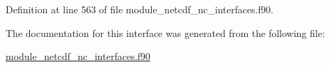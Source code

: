 Definition at line 563 of file module\+\_\+netcdf\+\_\+nc\+\_\+interfaces.\+f90.



The documentation for this interface was generated from the following file\+:\begin{DoxyCompactItemize}
\item 
\hyperlink{module__netcdf__nc__interfaces_8f90}{module\+\_\+netcdf\+\_\+nc\+\_\+interfaces.\+f90}\end{DoxyCompactItemize}
